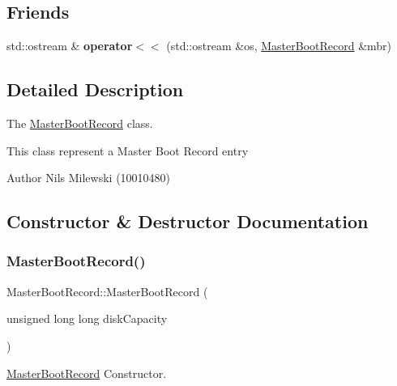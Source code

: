 \subsection*{Friends}
\begin{DoxyCompactItemize}
\item 
\mbox{\label{classcore_1_1disk_1_1_master_boot_record_a33e3ea037895ea6142548552beee358a}} 
std\+::ostream \& {\bfseries operator$<$$<$} (std\+::ostream \&os, \mbox{\hyperlink{classcore_1_1disk_1_1_master_boot_record}{Master\+Boot\+Record}} \&mbr)
\end{DoxyCompactItemize}


\subsection{Detailed Description}
The \mbox{\hyperlink{classcore_1_1disk_1_1_master_boot_record}{Master\+Boot\+Record}} class. 

This class represent a Master Boot Record entry \begin{DoxyAuthor}{Author}
Nils Milewski (10010480) 
\end{DoxyAuthor}


\subsection{Constructor \& Destructor Documentation}
\mbox{\label{classcore_1_1disk_1_1_master_boot_record_ad037f4c38e76f64b7d06f8795531442c}} 
\subsubsection{\texorpdfstring{Master\+Boot\+Record()}{MasterBootRecord()}}
{\footnotesize\ttfamily Master\+Boot\+Record\+::\+Master\+Boot\+Record (\begin{DoxyParamCaption}\item[{unsigned long long}]{disk\+Capacity }\end{DoxyParamCaption})}



\mbox{\hyperlink{classcore_1_1disk_1_1_master_boot_record}{Master\+Boot\+Record}} Constructor. 

